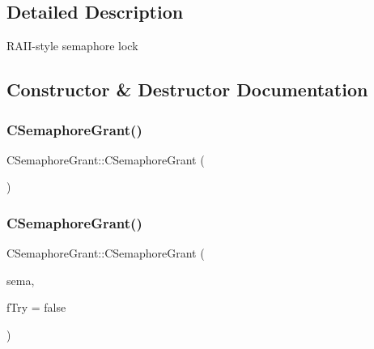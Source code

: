 \subsection{Detailed Description}
R\+A\+I\+I-\/style semaphore lock 

\subsection{Constructor \& Destructor Documentation}
\mbox{\label{class_c_semaphore_grant_a84ca79a4c8519f1a69697c060cabc51d}} 
\subsubsection{\texorpdfstring{C\+Semaphore\+Grant()}{CSemaphoreGrant()}\hspace{0.1cm}{\footnotesize\ttfamily [1/2]}}
{\footnotesize\ttfamily C\+Semaphore\+Grant\+::\+C\+Semaphore\+Grant (\begin{DoxyParamCaption}{ }\end{DoxyParamCaption})\hspace{0.3cm}{\ttfamily [inline]}}

\mbox{\label{class_c_semaphore_grant_a5998c457c7c223a8257166161d12b355}} 
\subsubsection{\texorpdfstring{C\+Semaphore\+Grant()}{CSemaphoreGrant()}\hspace{0.1cm}{\footnotesize\ttfamily [2/2]}}
{\footnotesize\ttfamily C\+Semaphore\+Grant\+::\+C\+Semaphore\+Grant (\begin{DoxyParamCaption}\item[{\mbox{\hyperlink{class_c_semaphore}{C\+Semaphore}} \&}]{sema,  }\item[{bool}]{f\+Try = {\ttfamily false} }\end{DoxyParamCaption})\hspace{0.3cm}{\ttfamily [inline]}}

